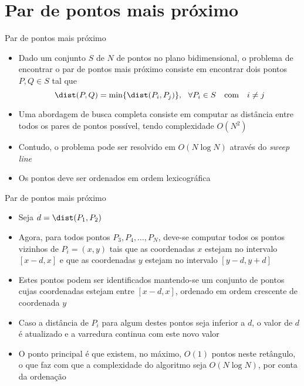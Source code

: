 \section{Par de pontos mais próximo}

\begin{frame}[fragile]{Par de pontos mais próximo}

    \begin{itemize}
        \item Dado um conjunto $S$ de $N$ de pontos no plano bidimensional, o problema de 
            encontrar o par de pontos mais próximo consiste em encontrar dois pontos $P, Q\in S$
            tal que
            \[
                \dist(P, Q) = \min\lbrace \dist(P_i, P_j)\rbrace,\ \ \forall P_i\in S\ \ \ \mbox{com}\ \ \ i \neq j
            \]
        \pause

        \item Uma abordagem de busca completa consiste em computar as distância entre todos
            os pares de pontos possível, tendo complexidade $O(N^2)$
        \pause

        \item Contudo, o problema pode ser resolvido em $O(N\log N)$ através do \textit{sweep line}
        \pause

        \item Os pontos deve ser ordenados em ordem lexicográfica
    \end{itemize}

\end{frame}

\begin{frame}[fragile]{Par de pontos mais próximo}

    \begin{itemize}
 
        \item Seja $d = \dist(P_1, P_2)$
        \pause
 
        \item Agora, para todos pontos $P_3, P_4, \ldots, P_N$, deve-se computar todos os pontos
            vizinhos de $P_i = (x, y)$ tais que as coordenadas $x$ estejam no intervalo
            $[x - d, x]$ e que as coordenadas $y$ estejam no intervalo $[y - d, y + d]$
        \pause

        \item Estes pontos podem ser identificados mantendo-se um conjunto de pontos cujas 
            coordenadas estejam entre $[x - d, x]$, ordenado em ordem crescente de coordenada
            $y$
        \pause

        \item Caso a distância de $P_i$ para algum destes pontos seja inferior a $d$, o valor de
            $d$ é atualizado e a varredura continua com este novo valor
        \pause

        \item O ponto principal é que existem, no máximo, $O(1)$ pontos neste retângulo, o que
            faz com que a complexidade do algoritmo seja $O(N\log N)$, por conta da ordenação

    \end{itemize}

\end{frame}

